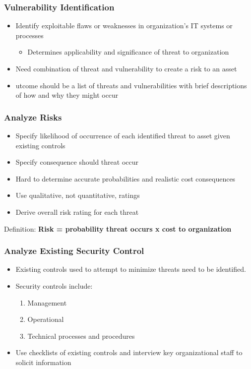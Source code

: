 \documentclass[xcolor ={table,usenames,dvipsnames}]{beamer}
\theoremstyle{definition}
\begin{document}
	\begin{frame}
		\frametitle{Vulnerability Identification}
		\begin{itemize}
			\item Identify exploitable flaws or weaknesses in organization’s IT systems or processes
			\begin{itemize}
				\item Determines applicability and significance of threat to organization
			\end{itemize}
			\item Need combination of threat and vulnerability to create a risk to an asset
			\item utcome should be a list of threats and vulnerabilities with brief descriptions of how and why they might occur
		\end{itemize}
	\end{frame}

	\begin{frame}
		\frametitle{Analyze Risks}
		\begin{itemize}
			\item Specify likelihood of occurrence of each identified threat to asset given existing controls
			\item Specify consequence should threat occur
			\item Hard to determine accurate               probabilities and realistic cost          consequences
			\item Use qualitative, not quantitative, ratings 
			\item Derive overall risk rating for each threat
		\end{itemize}
		\begin{alertblock}{Definition:}
			\textbf{Risk = probability threat occurs x cost to organization}
		\end{alertblock}
	\end{frame}

	\begin{frame}
		\frametitle{Analyze Existing Security Control } 
		\begin{itemize}
			\item Existing controls used to attempt to minimize threats need to be identified.
			\item Security controls include:
			\begin{enumerate}
				\item Management
				\item Operational
				\item Technical processes and procedures
			\end{enumerate}
			\item Use checklists of existing controls and interview key organizational staff to solicit information
		\end{itemize}
	\end{frame}
\end{document}

